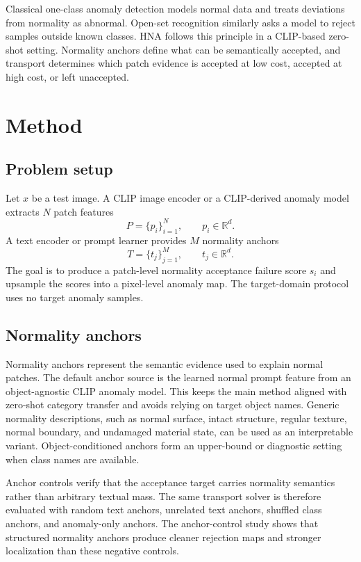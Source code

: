 \documentclass[10pt]{article}
\newcommand{\method}{HNA}
\begin{document}
Classical one-class anomaly detection models normal data and treats deviations from normality as abnormal.
Open-set recognition similarly asks a model to reject samples outside known classes.
\method{} follows this principle in a CLIP-based zero-shot setting.
Normality anchors define what can be semantically accepted, and transport determines which patch evidence is accepted at low cost, accepted at high cost, or left unaccepted.

\section{Method}

\subsection{Problem setup}

Let $x$ be a test image.
A CLIP image encoder or a CLIP-derived anomaly model extracts $N$ patch features
\begin{equation}
    P = \{p_i\}_{i=1}^{N}, \qquad p_i \in \mathbb{R}^{d}.
\end{equation}
A text encoder or prompt learner provides $M$ normality anchors
\begin{equation}
    T = \{t_j\}_{j=1}^{M}, \qquad t_j \in \mathbb{R}^{d}.
\end{equation}
The goal is to produce a patch-level normality acceptance failure score $s_i$ and upsample the scores into a pixel-level anomaly map.
The target-domain protocol uses no target anomaly samples.

\subsection{Normality anchors}

Normality anchors represent the semantic evidence used to explain normal patches.
The default anchor source is the learned normal prompt feature from an object-agnostic CLIP anomaly model.
This keeps the main method aligned with zero-shot category transfer and avoids relying on target object names.
Generic normality descriptions, such as normal surface, intact structure, regular texture, normal boundary, and undamaged material state, can be used as an interpretable variant.
Object-conditioned anchors form an upper-bound or diagnostic setting when class names are available.

Anchor controls verify that the acceptance target carries normality semantics rather than arbitrary textual mass.
The same transport solver is therefore evaluated with random text anchors, unrelated text anchors, shuffled class anchors, and anomaly-only anchors.
The anchor-control study shows that structured normality anchors produce cleaner rejection maps and stronger localization than these negative controls.
\end{document}
